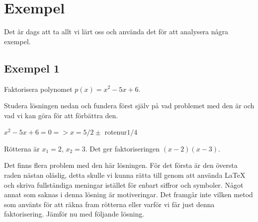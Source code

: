 \documentclass[titlepage]{article}
\begin{document}

\section{Exempel}


Det är dags att ta allt vi lärt oss och använda det för att analysera några exempel.

\subsection*{Exempel 1}

\begin{center}
\begin{tcolorbox}[width=\linewidth,colback={white},title={\textbf{Problem}},outer arc=0mm,colupper=black]
    Faktorisera polynomet $p(x)=x^2-5x+6$.
\end{tcolorbox} 
\end{center}

Studera lösningen nedan och fundera först själv på vad problemet med den är och vad vi kan göra för att förbättra den.

\begin{center}
\begin{tcolorbox}[width=\linewidth,colback={red!15!white},title={\textbf{Lösning 1 - Sämre}},outer arc=0mm,colupper=black]
    $x^2-5x+6 = 0 => x=5/2 \pm$ rotenur$1/4$

    Rötterna är $x_1 = 2$, $x_2 = 3$. Det ger faktoriseringen $(x-2)(x-3)$.
\end{tcolorbox} 
\end{center}

Det finns flera problem med den här lösningen. För det första är den översta raden nästan oläslig, detta skulle vi kunna rätta till genom att använda \LaTeX$\:$och skriva fullständiga meningar istället för enbart siffror och symboler. Något annat som saknas i denna lösning är motiveringar. Det framgår inte vilken metod som använts för att räkna fram rötterna eller varför vi får just denna faktorisering. Jämför nu med följande lösning.
\end{document}
